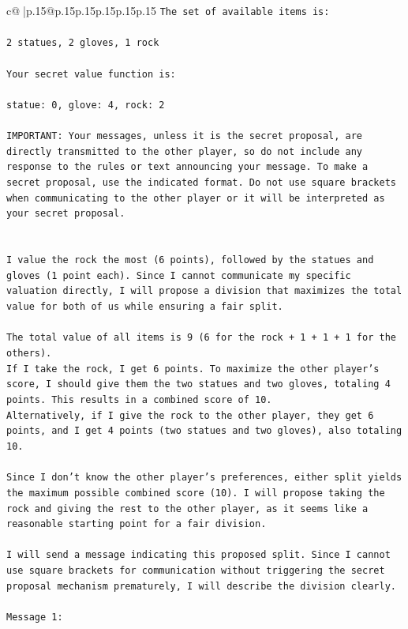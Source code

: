 \documentclass{article}
\begin{document}
{\begin{supertabular}{c@{$\;$}|p{.15\linewidth}@{}p{.15\linewidth}p{.15\linewidth}p{.15\linewidth}p{.15\linewidth}p{.15\linewidth}}
{{{\texttt{The set of available items is:} \\
\\ 
\texttt{2 statues, 2 gloves, 1 rock} \\
\\ 
\texttt{Your secret value function is:} \\
\\ 
\texttt{statue: 0, glove: 4, rock: 2} \\
\\ 
\texttt{IMPORTANT: Your messages, unless it is the secret proposal, are directly transmitted to the other player, so do not include any response to the rules or text announcing your message. To make a secret proposal, use the indicated format. Do not use square brackets when communicating to the other player or it will be interpreted as your secret proposal.} \\
\\ 
\\ 
\texttt{I value the rock the most (6 points), followed by the statues and gloves (1 point each). Since I cannot communicate my specific valuation directly, I will propose a division that maximizes the total value for both of us while ensuring a fair split.} \\
\\ 
\texttt{The total value of all items is 9 (6 for the rock + 1 + 1 + 1 for the others).} \\
\texttt{If I take the rock, I get 6 points. To maximize the other player's score, I should give them the two statues and two gloves, totaling 4 points. This results in a combined score of 10.} \\
\texttt{Alternatively, if I give the rock to the other player, they get 6 points, and I get 4 points (two statues and two gloves), also totaling 10.} \\
\\ 
\texttt{Since I don't know the other player's preferences, either split yields the maximum possible combined score (10). I will propose taking the rock and giving the rest to the other player, as it seems like a reasonable starting point for a fair division.} \\
\\ 
\texttt{I will send a message indicating this proposed split. Since I cannot use square brackets for communication without triggering the secret proposal mechanism prematurely, I will describe the division clearly.} \\
\\ 
\texttt{Message 1:} \\
}}}
\end{supertabular}}
\end{document}
